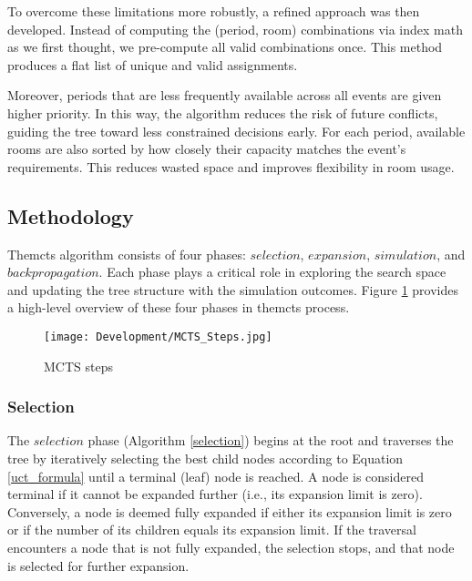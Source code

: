 To overcome these limitations more robustly, a refined approach was then developed. Instead of computing the (period, room) combinations via index math as we first thought, we pre-compute all valid combinations once. This method produces a flat list of unique and valid assignments.

Moreover, periods that are less frequently available across all events are given higher priority. In this way, the algorithm reduces the risk of future conflicts, guiding the tree toward less constrained decisions early. For each period, available rooms are also sorted by how closely their capacity matches the event’s requirements. This reduces wasted space and improves flexibility in room usage.

\subsection{Methodology}\label{sec:methodology}

The\ac{mcts} algorithm consists of four phases: \(selection\), \(expansion\), \(simulation\), and \(backpropagation\). Each phase plays a critical role in exploring the search space and updating the tree structure with the simulation outcomes. Figure \ref{fig:mcts_steps} provides a high-level overview of these four phases in the\ac{mcts} process.

\begin{figure}[H]
      \centering
      \texttt{[image: Development/MCTS\_Steps.jpg]}
      \caption[MCTS steps]
      {MCTS steps}
      \label{fig:mcts_steps}
\end{figure}

\subsubsection{Selection}

The \(selection\) phase (Algorithm \ref{selection}) begins at the root and traverses the tree by iteratively selecting the best child nodes according to Equation \ref{uct_formula} until a terminal (leaf) node is reached. A node is considered terminal if it cannot be expanded further (i.e., its expansion limit is zero). Conversely, a node is deemed fully expanded if either its expansion limit is zero or if the number of its children equals its expansion limit. If the traversal encounters a node that is not fully expanded, the selection stops, and that node is selected for further expansion.

